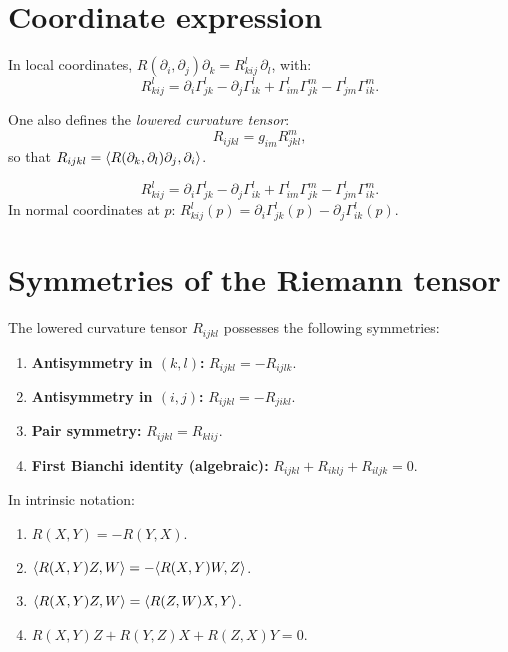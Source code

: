 \section{Coordinate expression}

In local coordinates, $R(\partial_i, \partial_j)\partial_k = R^l_{kij}\, \partial_l$,
with:
\[
    R^l_{kij} = \partial_i \Gamma^l_{jk} - \partial_j \Gamma^l_{ik}
    + \Gamma^l_{im}\Gamma^m_{jk} - \Gamma^l_{jm}\Gamma^m_{ik}.
\]

One also defines the \emph{lowered curvature tensor}:
\[
    R_{ijkl} = g_{im} R^m_{jkl},
\]
so that $R_{ijkl} = \langle R(\partial_k, \partial_l)\partial_j, \partial_i \rangle$.

\begin{keyformulas}[title=\textbf{Components of the Riemann tensor}]
\[
    R^l_{kij} = \partial_i \Gamma^l_{jk} - \partial_j \Gamma^l_{ik}
    + \Gamma^l_{im}\Gamma^m_{jk} - \Gamma^l_{jm}\Gamma^m_{ik}.
\]
In normal coordinates at $p$: $R^l_{kij}(p) = \partial_i \Gamma^l_{jk}(p)
- \partial_j \Gamma^l_{ik}(p)$.
\end{keyformulas}

\section{Symmetries of the Riemann tensor}

\begin{theorem}
\label{thm:symmetries}
The lowered curvature tensor $R_{ijkl}$ possesses the following symmetries:
\begin{enumerate}
    \item \textbf{Antisymmetry in $(k,l)$:} $R_{ijkl} = -R_{ijlk}$.
    \item \textbf{Antisymmetry in $(i,j)$:} $R_{ijkl} = -R_{jikl}$.
    \item \textbf{Pair symmetry:} $R_{ijkl} = R_{klij}$.
    \item \textbf{First Bianchi identity (algebraic):}
          $R_{ijkl} + R_{iklj} + R_{iljk} = 0$.
\end{enumerate}
In intrinsic notation:
\begin{enumerate}
    \item $R(X,Y) = -R(Y,X)$.
    \item $\langle R(X,Y)Z, W \rangle = -\langle R(X,Y)W, Z \rangle$.
    \item $\langle R(X,Y)Z, W \rangle = \langle R(Z,W)X, Y \rangle$.
    \item $R(X,Y)Z + R(Y,Z)X + R(Z,X)Y = 0$.
\end{enumerate}
\end{theorem}

